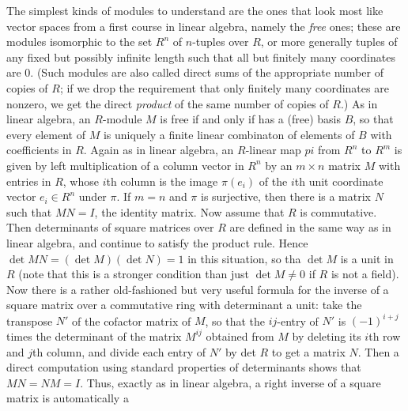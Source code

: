 \documentclass[10pt]{article}
\begin{document}
The simplest kinds of modules to understand are the ones that look most
like vector spaces from a first course in linear algebra, namely the
{\sl free} ones; these are modules isomorphic to the set $R^n$ of
$n$-tuples over $R$, or more generally tuples of any fixed but possibly
infinite length such that all but finitely many coordinates are 0. (Such
modules are also called direct sums of the appropriate number of copies
of $R$; if we drop the requirement that only finitely many coordinates
are nonzero, we get the direct {\sl product} of the same number of
copies of $R$.) As in linear algebra, an $R$-module $M$ is free if and
only if has a (free) basis $B$, so that every element of $M$ is uniquely
a finite linear combinaton of elements of $B$ with coefficients in $R$.
Again as in linear algebra, an $R$-linear map $pi$ from $R^n$ to $R^m$
is given by left multiplication of a column vector in $R^n$ by an
$m\times n$ matrix $M$ with entries in $R$, whose $i$th column is the
image $\pi(e_i)$ of the $i$th unit coordinate vector $e_i\in R^n$ under
$\pi$. If $m=n$ and $\pi$ is surjective, then there is a matrix $N$ such
that $MN = I$, the identity matrix. Now assume that $R$ is commutative.
Then determinants of square matrices over $R$ are defined in the same
way as in linear algebra, and continue to satisfy the product rule.
Hence $\det MN =(\det M)(\det N) = 1$ in this situation, so tha $\det M$
is a unit in $R$ (note that this is a stronger condition than just $\det
M\ne0$ if $R$ is not a field). Now there is a rather old-fashioned but
very useful formula for the inverse of a square matrix over a
commutative ring with determinant a unit: take the transpose $N'$ of the
cofactor matrix of $M$, so that the $ij$-entry of $N'$ is $(-1)^{i+j}$
times the determinant of the matrix $M^{ij}$ obtained from $M$ by
deleting its $i$th row and $j$th column, and divide each entry of $N'$
by det $R$ to get a matrix $N$. Then a direct computation using standard
properties of determinants shows that $MN = NM = I$. Thus, exactly as in
linear algebra, a right inverse of a square matrix is automatically a
\end{document}
